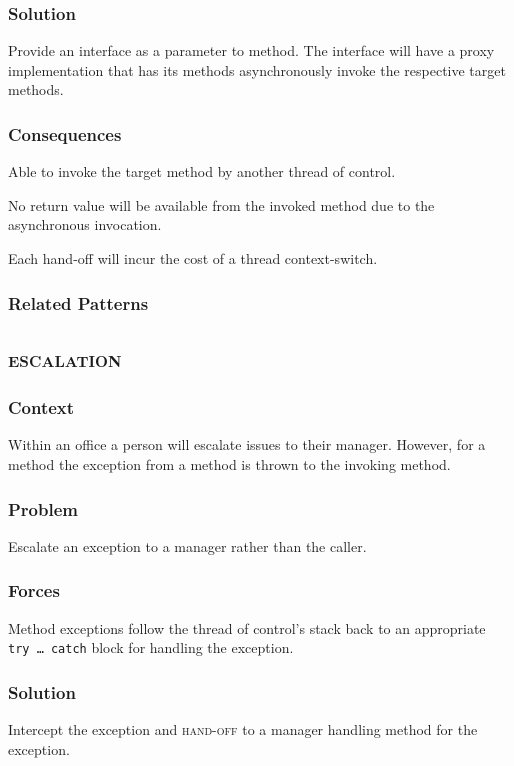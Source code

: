 \documentclass[prodmode]{style/acmlarge}
\begin{document}
\subsubsection*{Solution}  Provide an interface as a parameter to method.  The
interface will have a proxy implementation that has its methods asynchronously
invoke the respective target methods.

\subsubsection*{Consequences} Able to invoke the target method by another thread of control.

No return value will be available from the invoked method due to the
asynchronous invocation.

Each hand-off will incur the cost of a thread context-switch.

\subsubsection*{Related Patterns}



\subsection{\textsc{\textbf{escalation}}}

\subsubsection*{Context} Within an office a person will escalate issues to their
manager.  However, for a method the exception from a method is thrown to the
invoking method.

\subsubsection*{Problem} Escalate an exception to a manager rather than the caller.

\subsubsection*{Forces} Method exceptions follow the thread of control's stack
back to an appropriate \texttt{try~\ldots~catch} block for handling the
exception.

\subsubsection*{Solution} Intercept the exception and \textsc{hand-off} to a
manager handling method for the exception.
\end{document}
